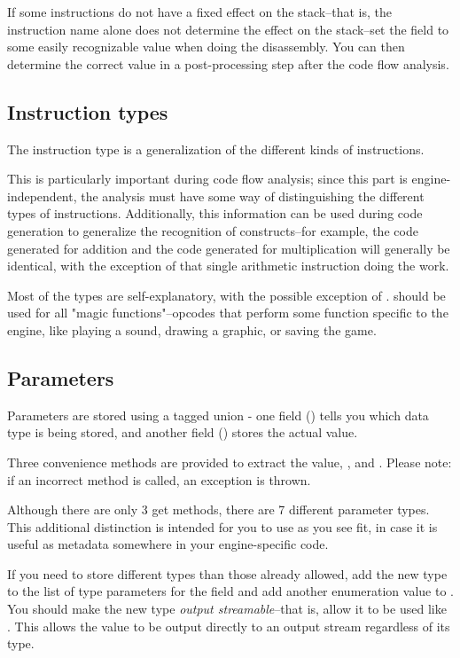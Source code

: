 If some instructions do not have a fixed effect on the stack--that is, the instruction name alone does not determine the effect on the stack--set the field to some easily recognizable value when doing the disassembly. You can then determine the correct value in a post-processing step after the code flow analysis.

\subsection{Instruction types}
\label{sec:insttype}
The instruction type is a generalization of the different kinds of instructions.

This is particularly important during code flow analysis; since this part is engine-independent, the analysis must have some way of distinguishing the different types of instructions. Additionally, this information can be used during code generation to generalize the recognition of constructs--for example, the code generated for addition and the code generated for multiplication will generally be identical, with the exception of that single arithmetic instruction doing the work.

Most of the types are self-explanatory, with the possible exception of .  should be used for all "magic functions"--opcodes that perform some function specific to the engine, like playing a sound, drawing a graphic, or saving the game.

\subsection{Parameters}
\label{sec:parameter}
Parameters are stored using a tagged union - one field () tells you which data type is being stored, and another field () stores the actual value.

Three convenience methods are provided to extract the value, ,  and . Please note: if an incorrect method is called, an exception is thrown.

Although there are only 3 get methods, there are 7 different parameter types. This additional distinction is intended for you to use as you see fit, in case it is useful as metadata somewhere in your engine-specific code.

If you need to store different types than those already allowed, add the new type to the list of type parameters for the  field and add another enumeration value to . You should make the new type \emph{output streamable}--that is, allow it to be used like . This allows the value to be output directly to an output stream regardless of its type.

